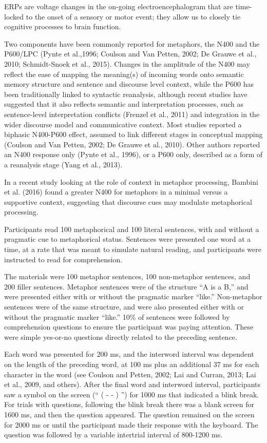 \documentclass[]{article}
\begin{document}
	ERPs are voltage changes in the on-going electroencephalogram that are time-locked to the onset of a sensory or motor event; they allow us to closely tie cognitive processes to brain function.
	
	Two components have been commonly reported for metaphors, the N400 and  the P600/LPC (Pynte et al.,1996; Coulson and Van Petten, 2002; De Grauwe et al., 2010; Schmidt-Snoek et al., 2015).
	Changes in the amplitude of the N400 may reflect the ease of mapping the meaning(s) of incoming words onto semantic memory structure and sentence and discourse level context, while the P600 has been traditionally linked to syntactic reanalysis, although recent studies have suggested that it also reflects semantic and interpretation processes, such as sentence-level interpretation conflicts (Frenzel et al., 2011) and integration in the wider discourse model and communicative context.
	Most studies reported a biphasic N400-P600 effect, assumed to link different stages in conceptual mapping (Coulson and Van Petten, 2002; De Grauwe et al., 2010). Other authors reported an N400 response only (Pynte et al., 1996), or a P600 only, described as a form of a reanalysis stage (Yang et al., 2013).
	
	In a recent study looking at the role of context in metaphor processing, Bambini et al. (2016) found a greater N400 for metaphors in a minimal versus a supportive context, suggesting that discourse cues may modulate metaphorical processing.
	
	Participants read 100 metaphorical and 100 literal sentences, with and without a pragmatic cue to metaphorical status.
	Sentences were presented one word at a time, at a rate that was meant to simulate natural reading, and participants were instructed to read for comprehension.
	
	The materials were 100 metaphor sentences, 100 non-metaphor sentences, and 200 filler sentences. Metaphor sentences were of the structure “A is a B,” and were presented either with or without the pragmatic marker “like.” 
	Non-metaphor sentences were of the same structure, and were also presented either with or without the pragmatic marker “like.”
	10\% of sentences were followed by comprehension questions to ensure the participant was paying attention. These were simple yes-or-no questions directly related to the preceding sentence.
	
	Each word was presented for 200 ms, and the interword interval was dependent on the length of the preceding word, at 100 ms plus an additional 37 ms for each character in the word (see Coulson and Petten, 2002; Lai and Curran, 2013; Lai et al., 2009, and others). After the final word and interword interval, participants saw a symbol on the screen (“ ( - - ) ”) for 1000 ms that indicated a blink break. For trials with questions, following the blink break there was a blank screen for 1600 ms, and then the question appeared. The question remained on the screen for 2000 ms or until the participant made their response with the keyboard. The question was followed by a variable intertrial interval of 800-1200 ms.
	
\end{document}
